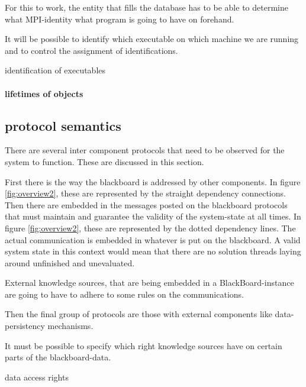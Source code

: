 \documentclass[]{lofar}
\begin{document}
        For this to work, the entity that fills the database has to be
        able to determine what MPI-identity what program is going to
        have on forehand.

        \begin{assumption}
          It will be possible to identify which executable on which
          machine we are running and to control the assignment of
          identifications.
          \caption{identification of executables\label{ass:ident}}
        \end{assumption}

        \paragraph{lifetimes of objects}

    \subsection{protocol semantics}

      There are several inter component protocols that need to be
      observed for the system to function. These are discussed in this
      section.

      First there is the way the blackboard is addressed by other
      components. In figure
      \hyperlink{fig:overview2}{\ref{fig:overview2}}, these are
      represented by the straight dependency connections. Then there
      are embedded in the messages posted on the blackboard protocols
      that must maintain and guarantee the validity of the
      system-state at all times. In figure
      \hyperlink{fig:overview}{\ref{fig:overview2}}, these are
      represented by the dotted dependency lines. The actual
      communication is embedded in whatever is put on the
      blackboard. A valid system state in this context would mean that
      there are no solution threads laying around unfinished and
      unevaluated.

      External knowledge sources, that are being embedded in a
      BlackBoard-instance are going to have to adhere to some rules on
      the communications.

      Then the final group of protocols are those with external
      components like data-persistency mechanisms.

      \begin{requirement}
        It must be possible to specify which right knowledge sources
        have on certain parts of the blackboard-data.
        \caption{data access rights\label{req:data-access-rights}}
        \hypertarget{req:data-access-rights}{}
      \end{requirement}
\end{document}

